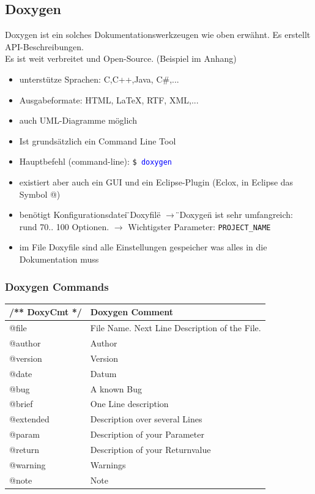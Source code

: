 \subsection{Doxygen}
Doxygen ist ein solches Dokumentationswerkzeugen wie oben erwähnt. Es erstellt API-Beschreibungen.\\
Es ist weit verbreitet und Open-Source. (Beispiel im Anhang)
\begin{itemize}
	\item unterstütze Sprachen: C,C++,Java, C\#,...
	\item Ausgabeformate: HTML, LaTeX, RTF, XML,...
	\item auch UML-Diagramme möglich
	\item Ist grundsätzlich ein Command Line Tool
	\item Hauptbefehl (command-line): \texttt{\$ \textcolor{blue}{doxygen}}
	\item existiert aber auch ein GUI und ein Eclipse-Plugin (Eclox, in Eclipse das Symbol @)
	\item benötigt Konfigurationsdatei \"{}Doxyfile\"{} \newline
	 $\rightarrow$ \"{}Doxygen\"{} ist sehr umfangreich: rund 70.. 100 Optionen. \newline $\rightarrow$ Wichtigster Parameter: \texttt{PROJECT\_NAME} 
	\item im File Doxyfile sind alle Einstellungen gespeicher was alles in die Dokumentation muss
\end{itemize}
    \renewcommand{\arraystretch}{1.3}
    \begin{minipage}{0.5\linewidth}
        \subsubsection{Doxygen Commands}
        \begin{tabular}{|l|l|}
        	\hline	/** DoxyCmt */  &  Doxygen Comment\\ 
        	\hline	@file	      	& File Name. Next Line Description of the File.\\
        	\hline	@author 	    & Author\\
        	\hline	@version	    & Version \\
        	\hline   @date		    & Datum   \\ 
        	\hline   @bug    		& A known Bug \\
        	\hline   @brief	    	& One Line description  \\
        	\hline   @extended	    & Description over several Lines  \\
        	\hline   @param	       	& Description of your Parameter  \\
        	\hline   @return	    & Description of your Returnvalue     \\ 
        	\hline   @warning	    & Warnings \\ 
        	\hline   @note		    & Note\\ 
        	\hline        
        \end{tabular}
    \end{minipage}
